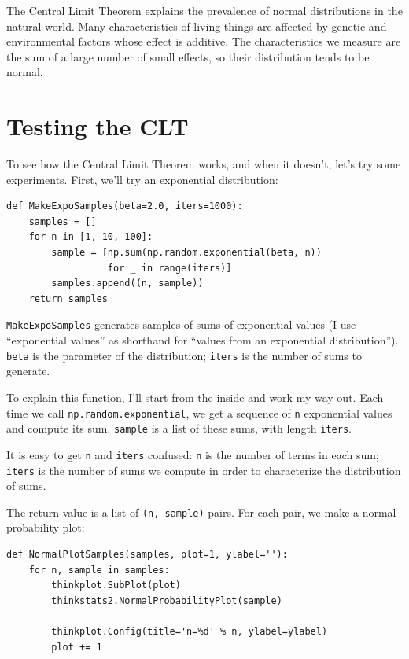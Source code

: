 \documentclass[12pt]{book}
\begin{document}
The Central Limit Theorem explains the prevalence
of normal distributions in the natural world.  Many characteristics of
living things are affected by genetic
and environmental factors whose effect is additive.  The characteristics
we measure are the sum of a large number of small effects, so their
distribution tends to be normal.


\section{Testing the CLT}

To see how the Central Limit Theorem works, and when it doesn't,
let's try some experiments.  First, we'll try
an exponential distribution:

\begin{verbatim}
def MakeExpoSamples(beta=2.0, iters=1000):
    samples = []
    for n in [1, 10, 100]:
        sample = [np.sum(np.random.exponential(beta, n))
                  for _ in range(iters)]
        samples.append((n, sample))
    return samples
\end{verbatim}

\verb"MakeExpoSamples" generates samples of sums of exponential values
(I use ``exponential values'' as shorthand for ``values from an
exponential distribution'').
\verb"beta" is the parameter of the distribution; \verb"iters"
is the number of sums to generate.

To explain this function, I'll start from the inside and work my way
out.  Each time we call \verb"np.random.exponential", we get a sequence
of \verb"n" exponential values and compute its sum.  \verb"sample"
is a list of these sums, with length \verb"iters".

It is easy to get \verb"n" and \verb"iters" confused:  \verb"n" is the
number of terms in each sum;  \verb"iters" is the number of sums we
compute in order to characterize the distribution of sums.

The return value is a list of \verb"(n, sample)" pairs.  For
each pair, we make a normal probability plot:

\begin{verbatim}
def NormalPlotSamples(samples, plot=1, ylabel=''):
    for n, sample in samples:
        thinkplot.SubPlot(plot)
        thinkstats2.NormalProbabilityPlot(sample)

        thinkplot.Config(title='n=%d' % n, ylabel=ylabel)
        plot += 1
\end{verbatim}
\end{document}
